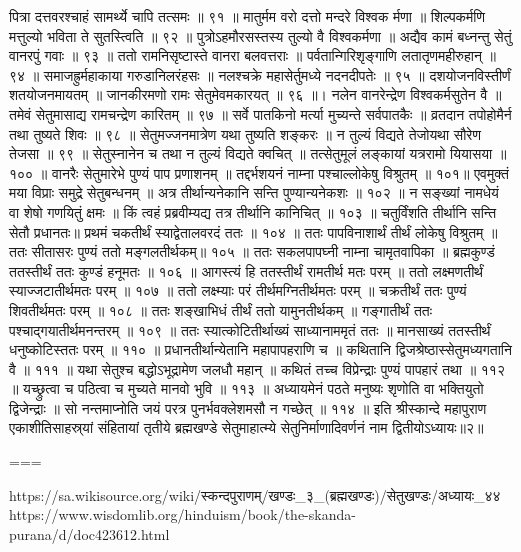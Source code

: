 पित्रा दत्तवरश्चाहं सामर्थ्ये चापि तत्समः ॥ ९१ ॥
मातुर्मम वरो दत्तो मन्दरे विश्वक र्मणा ॥
शिल्पकर्मणि मत्तुल्यो भविता ते सुतस्त्विति ॥ ९२ ॥
पुत्रोऽहमौरसस्तस्य तुल्यो वै विश्वकर्मणा ॥
अद्यैव कामं बध्नन्तु सेतुं वानरपुं गवाः ॥ ९३ ॥
ततो रामनिसृष्टास्ते वानरा बलवत्तराः ॥
पर्वतान्गिरिशृङ्गाणि लतातृणमहीरुहान् ॥ ९४ ॥
समाजह्रुर्महाकाया गरुडानिलरंहसः ॥
नलश्चक्रे महासेर्तुमध्ये नदनदीपतेः ॥ ९५ ॥
दशयोजनविस्तीर्णं शतयोजनमायतम् ॥
जानकीरमणो रामः सेतुमेवमकारयत् ॥ ९६ ॥।
नलेन वानरेन्द्रेण विश्वकर्मसुतेन वै ॥
तमेवं सेतुमासाद्य रामचन्द्रेण कारितम् ॥ ९७ ॥
सर्वे पातकिनो मर्त्या मुच्यन्ते सर्वपातकैः ॥
व्रतदान तपोहोमैर्न तथा तुष्यते शिवः ॥ ९८ ॥
सेतुमज्जनमात्रेण यथा तुष्यति शङ्करः ॥
न तुल्यं विद्यते तेजोयथा सौरेण तेजसा ॥ ९९ ॥
सेतुस्नानेन च तथा न तुल्यं विद्यते क्वचित् ॥
तत्सेतुमूलं लङ्कायां यत्ररामो यियासया ॥ १०० ॥
वानरैः सेतुमारेभे पुण्यं पाप प्रणाशनम् ॥
तद्दर्भशयनं नाम्ना पश्चाल्लोकेषु विश्रुतम् ॥ १०१॥
एवमुक्तं मया विप्राः समुद्रे सेतुबन्धनम् ॥
अत्र तीर्थान्यनेकानि सन्ति पुण्यान्यनेकशः ॥ १०२ ॥
न सङ्ख्यां नामधेयं वा शेषो गणयितुं क्षमः ॥
किं त्वहं प्रब्रवीम्यद्य तत्र तीर्थानि कानिचित् ॥ १०३ ॥
चतुर्विंशति तीर्थानि सन्ति सेतौ प्रधानतः॥
प्रथमं चकतीर्थं स्याद्वेतालवरदं ततः ॥ १०४ ॥
ततः पापविनाशार्थं तीर्थं लोकेषु विश्रुतम् ॥
ततः सीतासरः पुण्यं ततो मङ्गलतीर्थकम्॥ १०५ ॥
ततः सकलपापघ्नी नाम्ना चामृतवापिका ॥
ब्रह्मकुण्डं ततस्तीर्थं ततः कुण्डं हनूमतः ॥ १०६ ॥
आगस्त्यं हि ततस्तीर्थं रामतीर्थ मतः परम् ॥
ततो लक्ष्मणतीर्थं स्याज्जटातीर्थमतः परम् ॥ १०७ ॥
ततो लक्ष्म्याः परं तीर्थमग्नितीर्थमतः परम् ॥
चक्रतीर्थं ततः पुण्यं शिवतीर्थमतः परम् ॥ १०८ ॥
ततः शङ्खाभिधं तीर्थं ततो यामुनतीर्थकम् ॥
गङ्गातीर्थं ततः पश्चाद्गयातीर्थमनन्तरम् ॥ १०९ ॥
ततः स्यात्कोटितीर्थाख्यं साध्यानाममृतं ततः ॥
मानसाख्यं ततस्तीर्थं धनुष्कोटिस्ततः परम् ॥ ११० ॥
प्रधानतीर्थान्येतानि महापापहराणि च ॥
कथितानि द्विजश्रेष्ठास्सेतुमध्यगतानि वै ॥ १११ ॥
यथा सेतुश्च बद्धोऽभूद्रामेण जलधौ महान् ॥
कथितं तच्च विप्रेन्द्राः पुण्यं पापहारं तथा ॥ ११२ ॥
यच्छ्रुत्वा च पठित्वा च मुच्यते मानवो भुवि ॥ ११३ ॥
अध्यायमेनं पठते मनुष्यः शृणोति वा भक्तियुतो द्विजेन्द्राः ॥
सो नन्तमाप्नोति जयं परत्र पुनर्भवक्लेशमसौ न गच्छेत् ॥ ११४ ॥
इति श्रीस्कान्दे महापुराण एकाशीतिसाहस्र्यां संहितायां तृतीये ब्रह्मखण्डे सेतुमाहात्म्ये सेतुनिर्माणादिवर्णनं नाम द्वितीयोऽध्यायः॥२॥


===

https://sa.wikisource.org/wiki/स्कन्दपुराणम्/खण्डः_३_(ब्रह्मखण्डः)/सेतुखण्डः/अध्यायः_४४
https://www.wisdomlib.org/hinduism/book/the-skanda-purana/d/doc423612.html

